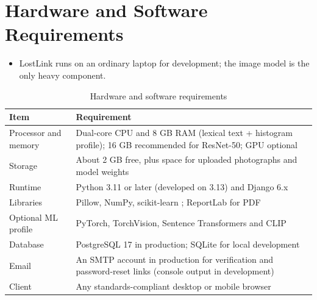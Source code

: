 \documentclass[12pt,a4paper,oneside]{report}
\begin{document}
\section{Hardware and Software Requirements}
\begin{itemize}
  \item LostLink runs on an ordinary laptop for development; the image model is the only heavy component.
\end{itemize}
\begin{table}[H]
\centering\small
\caption{Hardware and software requirements}
\begin{tabularx}{\textwidth}{P{34mm}X}
\toprule
Item & Requirement\\
\midrule
Processor and memory & Dual-core CPU and 8 GB RAM (lexical text + histogram profile); 16 GB recommended for ResNet-50; GPU optional\\
Storage & About 2 GB free, plus space for uploaded photographs and model weights\\
Runtime & Python 3.11 or later (developed on 3.13) and Django 6.x \cite{python,django}\\
Libraries & Pillow, NumPy, scikit-learn \cite{pillow,sklearn,sklearnpaper}; ReportLab for PDF \cite{reportlab}\\
Optional ML profile & PyTorch, TorchVision, Sentence Transformers and CLIP \cite{pytorch,pytorchpaper}\\
Database & PostgreSQL 17 in production; SQLite for local development \cite{postgres}\\
Email & An SMTP account in production for verification and password-reset links (console output in development)\\
Client & Any standards-compliant desktop or mobile browser\\
\bottomrule
\end{tabularx}
\end{table}
\end{document}
